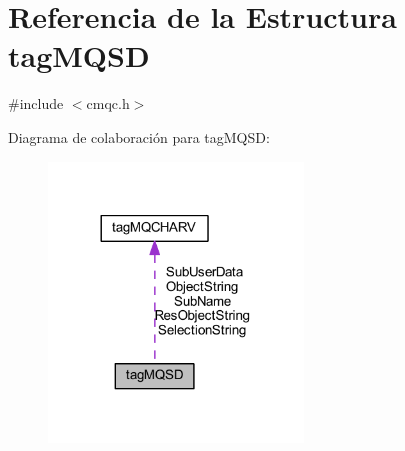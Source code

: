 \hypertarget{structtag_m_q_s_d}{}\section{Referencia de la Estructura tag\+M\+Q\+S\+D}
\label{structtag_m_q_s_d}


{\ttfamily \#include $<$cmqc.\+h$>$}



Diagrama de colaboración para tag\+M\+Q\+S\+D\+:\nopagebreak
\begin{figure}[H]
\begin{center}
\leavevmode
\includegraphics[width=192pt]{structtag_m_q_s_d__coll__graph}
\end{center}
\end{figure}
